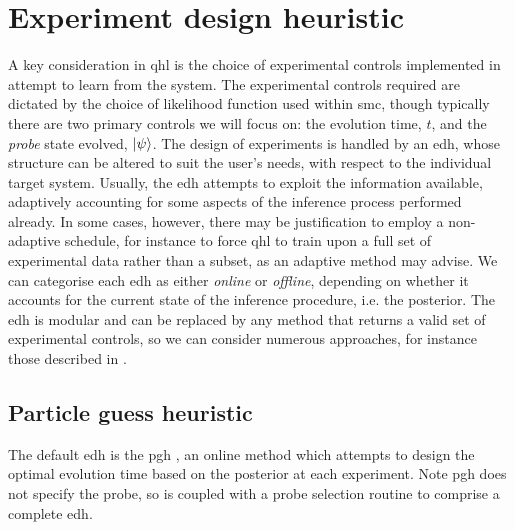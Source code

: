 \section{Experiment design heuristic}\label{sec:heuristic}
A key consideration in \gls{qhl} is the choice of experimental controls implemented in attempt to learn from the system. 
The experimental controls required are dictated by the choice of  \gls{likelihood} function used within \gls{smc}, 
    though typically there are two primary controls we will focus on: 
    the evolution time, $t$, and the \emph{\gls{probe}} state evolved, $\ket{\psi}$. 
The design of \glspl{experiment} is handled by an \gls{edh}, 
    whose structure can be altered to suit the user's needs, with respect to the individual target system. 
Usually, the \gls{edh} attempts to exploit the information available, 
    adaptively accounting for some aspects of the inference process performed already. 
In some cases, however, there may be justification to employ a non-adaptive schedule, 
    for instance to force \gls{qhl} to train upon a full set of experimental data rather than a subset,
    as an adaptive method may advise.
We can categorise each \gls{edh} as either \emph{online} or \emph{offline},
    depending on whether it accounts for the current state of the inference procedure, i.e. the posterior.
The \gls{edh} is modular and can be replaced by any method that returns a valid set of experimental controls, 
    so we can consider numerous approaches, for instance those described in \cite{hincks2018hamiltonian, fiderer2020neural}.
\par 

\subsection{Particle guess heuristic}\label{sec:pgh}
The default \gls{edh} is the \gls{pgh} \cite{Wiebe:2014qhl}, 
    an online method which attempts to design the optimal evolution time based on the posterior at each experiment.
Note \gls{pgh} does not specify the \gls{probe}, so is coupled with a \gls{probe} selection routine to comprise 
    a complete \gls{edh}.
\par

